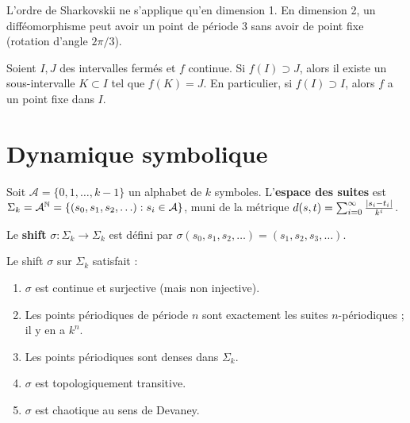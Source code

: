 \begin{remarque}
L'ordre de Sharkovskii ne s'applique qu'en dimension 1. En dimension 2,
un diff\'eomorphisme peut avoir un point de p\'eriode 3 sans avoir de point
fixe (rotation d'angle $2\pi/3$).
\end{remarque}

\begin{lemme}
\label{lem:graphe}
Soient $I, J$ des intervalles ferm\'es et $f$ continue. Si $f(I) \supset J$,
alors il existe un sous-intervalle $K \subset I$ tel que $f(K) = J$.
En particulier, si $f(I) \supset I$, alors $f$ a un point fixe dans $I$.
\end{lemme}

\section{Dynamique symbolique}

\begin{definition}
Soit $\mathcal{A} = \{0, 1, \ldots, k-1\}$ un alphabet de $k$ symboles.
L'\textbf{espace des suites} est
$\Sigma_k = \mathcal{A}^{\mathbb{N}} = \{(s_0, s_1, s_2, \ldots) : s_i \in \mathcal{A}\}$,
muni de la m\'etrique $d(s, t) = \sum_{i=0}^{\infty} \frac{\left| s_i - t_i \right|}{k^i}$.
\end{definition}

\begin{definition}
Le \textbf{shift} $\sigma : \Sigma_k \to \Sigma_k$ est d\'efini par
$\sigma(s_0, s_1, s_2, \ldots) = (s_1, s_2, s_3, \ldots)$.
\end{definition}

\begin{theoreme}
Le shift $\sigma$ sur $\Sigma_k$ satisfait :
\begin{enumerate}
    \item $\sigma$ est continue et surjective (mais non injective).
    \item Les points p\'eriodiques de p\'eriode $n$ sont exactement les suites
    $n$-p\'eriodiques ; il y en a $k^n$.
    \item Les points p\'eriodiques sont denses dans $\Sigma_k$.
    \item $\sigma$ est topologiquement transitive.
    \item $\sigma$ est chaotique au sens de Devaney.
\end{enumerate}
\end{theoreme}

